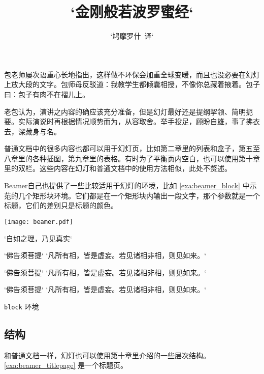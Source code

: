包老师屡次语重心长地指出，这样做不环保会加重全球变暖，而且也没必要在幻灯上放大段的文字。包师母反驳道：我教学生都倾囊相授，不像你总藏着掖着。包子曰：包子有肉不在褶儿上。

老包认为，演讲之内容的确应该充分准备，但是幻灯最好还是提纲挈领、简明扼要。实际演说时再根据情况顺势而为，从容取舍。举手投足，顾盼自雄，事了拂衣去，深藏身与名。

普通文档中的很多内容也都可以用于幻灯页，比如第二章里的列表和盒子，第五至八章里的各种插图，第九章里的表格。有时为了平衡页内空白，也可以使用第十章里的双栏。这些内容在幻灯和普通文档中的使用方法相似，此处不赘述。

Beamer自己也提供了一些比较适用于幻灯的环境，比如 \autoref{exa:beamer_block} 中示范的几个矩形块环境。它们都是在一个矩形块内输出一段文字，那个参数就是一个标题，它们的差别只是标题的颜色。

\begin{example}[h]
\begin{FBTDemo}[numbers=left]{
\centering
\texttt{[image: beamer.pdf]}
}
\begin{frame}{`自如之理，乃见真实`}
\begin{block}{`佛告须菩提`}
`凡所有相，皆是虚妄。若见诸相非相，则见如来。`
\end{block}
\begin{alertblock}{`佛告须菩提`}
`凡所有相，皆是虚妄。若见诸相非相，则见如来。`
\end{alertblock}
\begin{exampleblock}{`佛告须菩提`}
`凡所有相，皆是虚妄。若见诸相非相，则见如来。`
\end{exampleblock}
\end{frame}
\end{FBTDemo}
\caption{\texttt{block} 环境}
\label{exa:beamer_block}
\end{example}

\subsection{结构}

和普通文档一样，幻灯也可以使用第十章里介绍的一些层次结构。\autoref{exa:beamer_titlepage} 是一个标题页。 

\begin{Code}[]
\begin{frame}
\title{`金刚般若波罗蜜经`}
\author{`鸠摩罗什\ 译`}
\date{}
\maketitle
\end{frame}
\end{Code}

